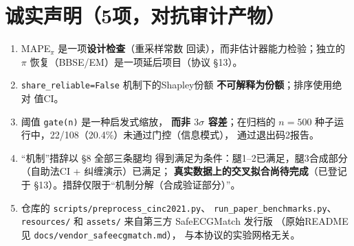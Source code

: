 \section*{诚实声明（5项，对抗审计产物）}
\label{sec:honesty}
\begin{enumerate}
    \item MAPE$_\pi$ 是一项\textbf{设计检查}（重采样常数
    回读），而非估计器能力检验；独立的 $\pi$
    恢复（BBSE/EM）是一项延后项目（协议 \S13）。
    \item \texttt{share\_reliable=False} 机制下的Shapley份额
    \textbf{不可解释为份额}；排序使用绝对
    值CI。
    \item 阈值 \texttt{gate(n)} 是一种启发式缩放，
    \textbf{而非 $3\sigma$ 容差}；在归档的 $n=500$
    种子运行中，22/108（20.4\%）未通过门控（信息模式），
    通过退出码2报告。
    \item ``机制''措辞以 \S8 全部三条腿均
    得到满足为条件：腿1--2已满足，腿3合成部分
    （自助法CI + 纠缠演示）已满足；
    \textbf{真实数据上的交叉拟合尚待完成}（已登记于
    \S13）。措辞仅限于``机制分解（合成验证部分）''。
    \item 仓库的 \texttt{scripts/preprocess\_cinc2021.py}、
    \texttt{run\_paper\_benchmarks.py}、\texttt{resources/} 和
    \texttt{assets/} 来自第三方 SafeECGMatch 发行版
    （原始README见 \texttt{docs/vendor\_safeecgmatch.md}），
    与本协议的实验网格无关。
\end{enumerate}
